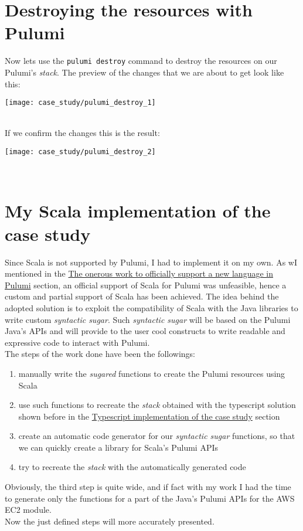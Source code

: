 \section{Destroying the resources with Pulumi}
Now lets use the \texttt{pulumi destroy} command to destroy the resources on our Pulumi's \textit{stack}.
The preview of the changes that we are about to get look like this:
\begin{center}
  \texttt{[image: case\_study/pulumi\_destroy\_1]} 
\end{center}\mbox{}\\

If we confirm the changes this is the result:
\begin{center}
  \texttt{[image: case\_study/pulumi\_destroy\_2]} 
\end{center}\mbox{}\\


\section{My Scala implementation of the case study}
Since Scala is not supported by Pulumi, I had to implement it on my own.
As wI mentioned in the \hyperref[sssec:off-support-pulumi]{The onerous work to officially support a new language in Pulumi} section, an official support of Scala for Pulumi was unfeasible, hence a custom and partial support of Scala has been achieved.
The idea behind the adopted solution is to exploit the compatibility of Scala with the Java libraries to write custom \textit{syntactic sugar}.
Such \textit{syntactic sugar} will be based on the Pulumi Java's APIs and will provide to the user cool constructs to write readable and expressive code to interact with Pulumi.\\
The steps of the work done have been the followings:
\begin{enumerate}
  \item manually write the \textit{sugared} functions to create the Pulumi resources using Scala
  \item use such functions to recreate the \textit{stack} obtained with the typescript solution shown before in the \hyperref[sec:typescript-impl]{Typescript implementation of the case study} section
  \item create an automatic code generator for our \textit{syntactic sugar} functions, so that we can quickly create a library for Scala's Pulumi APIs
  \item try to recreate the \textit{stack} with the automatically generated code
\end{enumerate}
Obviously, the third step is quite wide, and if fact with my work I had the time to generate only the functions for a part of the Java's Pulumi APIs for the AWS EC2 module.\\
Now the just defined steps will more accurately presented.

